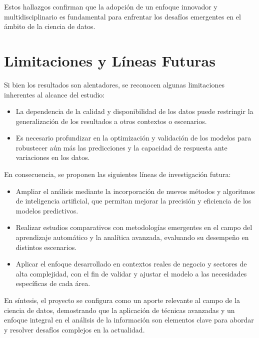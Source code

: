 Estos hallazgos confirman que la adopción de un enfoque innovador y multidisciplinario es fundamental para enfrentar los desafíos emergentes en el ámbito de la ciencia de datos.

\section{Limitaciones y Líneas Futuras}

Si bien los resultados son alentadores, se reconocen algunas limitaciones inherentes al alcance del estudio:

\begin{itemize}
    \item La dependencia de la calidad y disponibilidad de los datos puede restringir la generalización de los resultados a otros contextos o escenarios.
    \item Es necesario profundizar en la optimización y validación de los modelos para robustecer aún más las predicciones y la capacidad de respuesta ante variaciones en los datos.
\end{itemize}

En consecuencia, se proponen las siguientes líneas de investigación futura:

\begin{itemize}
    \item Ampliar el análisis mediante la incorporación de nuevos métodos y algoritmos de inteligencia artificial, que permitan mejorar la precisión y eficiencia de los modelos predictivos.
    \item Realizar estudios comparativos con metodologías emergentes en el campo del aprendizaje automático y la analítica avanzada, evaluando su desempeño en distintos escenarios.
    \item Aplicar el enfoque desarrollado en contextos reales de negocio y sectores de alta complejidad, con el fin de validar y ajustar el modelo a las necesidades específicas de cada área.
\end{itemize}

\bigskip

En síntesis, el proyecto se configura como un aporte relevante al campo de la ciencia de datos, demostrando que la aplicación de técnicas avanzadas y un enfoque integral en el análisis de la información son elementos clave para abordar y resolver desafíos complejos en la actualidad.
